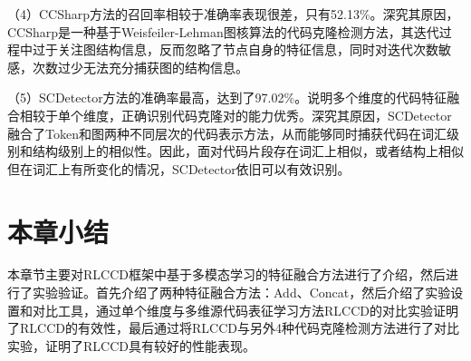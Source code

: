 （4）CCSharp方法的召回率相较于准确率表现很差，只有52.13\%。深究其原因，CCSharp是一种基于Weisfeiler-Lehman图核算法的代码克隆检测方法，其迭代过程中过于关注图结构信息，反而忽略了节点自身的特征信息，同时对迭代次数敏感，次数过少无法充分捕获图的结构信息。

（5）SCDetector方法的准确率最高，达到了97.02\%。说明多个维度的代码特征融合相较于单个维度，正确识别代码克隆对的能力优秀。深究其原因，SCDetector融合了Token和图两种不同层次的代码表示方法，从而能够同时捕获代码在词汇级别和结构级别上的相似性。因此，面对代码片段存在词汇上相似，或者结构上相似但在词汇上有所变化的情况，SCDetector依旧可以有效识别。

\section{本章小结}
本章节主要对RLCCD框架中基于多模态学习的特征融合方法进行了介绍，然后进行了实验验证。首先介绍了两种特征融合方法：Add、Concat，然后介绍了实验设置和对比工具，通过单个维度与多维源代码表征学习方法RLCCD的对比实验证明了RLCCD的有效性，最后通过将RLCCD与另外4种代码克隆检测方法进行了对比实验，证明了RLCCD具有较好的性能表现。



